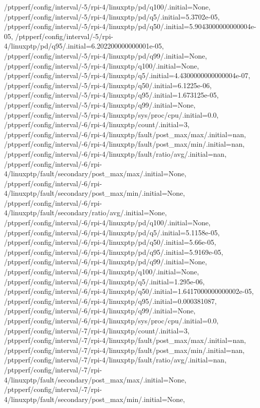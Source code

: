 {    /ptpperf/config/interval/-5/rpi-4/linuxptp/pd/q100/.initial=None,
    /ptpperf/config/interval/-5/rpi-4/linuxptp/pd/q5/.initial=5.3702e-05,
    /ptpperf/config/interval/-5/rpi-4/linuxptp/pd/q50/.initial=5.9043000000000004e-05,
    /ptpperf/config/interval/-5/rpi-4/linuxptp/pd/q95/.initial=6.202200000000001e-05,
    /ptpperf/config/interval/-5/rpi-4/linuxptp/pd/q99/.initial=None,
    /ptpperf/config/interval/-5/rpi-4/linuxptp/q100/.initial=None,
    /ptpperf/config/interval/-5/rpi-4/linuxptp/q5/.initial=4.4300000000000004e-07,
    /ptpperf/config/interval/-5/rpi-4/linuxptp/q50/.initial=6.1225e-06,
    /ptpperf/config/interval/-5/rpi-4/linuxptp/q95/.initial=1.673125e-05,
    /ptpperf/config/interval/-5/rpi-4/linuxptp/q99/.initial=None,
    /ptpperf/config/interval/-5/rpi-4/linuxptp/sys/proc/cpu/.initial=0.0,
    /ptpperf/config/interval/-6/rpi-4/linuxptp/count/.initial=3,
    /ptpperf/config/interval/-6/rpi-4/linuxptp/fault/post_max/max/.initial=nan,
    /ptpperf/config/interval/-6/rpi-4/linuxptp/fault/post_max/min/.initial=nan,
    /ptpperf/config/interval/-6/rpi-4/linuxptp/fault/ratio/avg/.initial=nan,
    /ptpperf/config/interval/-6/rpi-4/linuxptp/fault/secondary/post_max/max/.initial=None,
    /ptpperf/config/interval/-6/rpi-4/linuxptp/fault/secondary/post_max/min/.initial=None,
    /ptpperf/config/interval/-6/rpi-4/linuxptp/fault/secondary/ratio/avg/.initial=None,
    /ptpperf/config/interval/-6/rpi-4/linuxptp/pd/q100/.initial=None,
    /ptpperf/config/interval/-6/rpi-4/linuxptp/pd/q5/.initial=5.1158e-05,
    /ptpperf/config/interval/-6/rpi-4/linuxptp/pd/q50/.initial=5.66e-05,
    /ptpperf/config/interval/-6/rpi-4/linuxptp/pd/q95/.initial=5.9169e-05,
    /ptpperf/config/interval/-6/rpi-4/linuxptp/pd/q99/.initial=None,
    /ptpperf/config/interval/-6/rpi-4/linuxptp/q100/.initial=None,
    /ptpperf/config/interval/-6/rpi-4/linuxptp/q5/.initial=1.295e-06,
    /ptpperf/config/interval/-6/rpi-4/linuxptp/q50/.initial=1.6417000000000002e-05,
    /ptpperf/config/interval/-6/rpi-4/linuxptp/q95/.initial=0.000381087,
    /ptpperf/config/interval/-6/rpi-4/linuxptp/q99/.initial=None,
    /ptpperf/config/interval/-6/rpi-4/linuxptp/sys/proc/cpu/.initial=0.0,
    /ptpperf/config/interval/-7/rpi-4/linuxptp/count/.initial=3,
    /ptpperf/config/interval/-7/rpi-4/linuxptp/fault/post_max/max/.initial=nan,
    /ptpperf/config/interval/-7/rpi-4/linuxptp/fault/post_max/min/.initial=nan,
    /ptpperf/config/interval/-7/rpi-4/linuxptp/fault/ratio/avg/.initial=nan,
    /ptpperf/config/interval/-7/rpi-4/linuxptp/fault/secondary/post_max/max/.initial=None,
    /ptpperf/config/interval/-7/rpi-4/linuxptp/fault/secondary/post_max/min/.initial=None,
}
